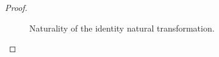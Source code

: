 \begin{example}
\begin{proof}
\begin{figure}[htbp]
\begin{subfigure}[b]{0.5\linewidth}
\begin{center}
        \end{center}
        \caption{}
        \label{fig:natural-id-b}
      \end{subfigure}
      \caption{Naturality of the identity natural transformation.}
      \label{fig:natural-id}
    \end{figure}

  \end{proof}

\end{example}

